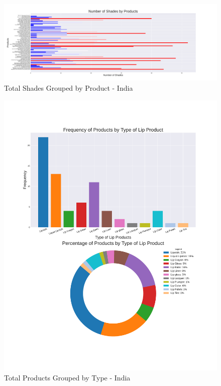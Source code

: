 \documentclass{article}
\begin{document}
\begin{center}
    \begin{landscape}
        \begin{figure}[htbp]
            \centering
            \includegraphics[scale=0.49]{../images/India-graphs/TotalShadesByProduct.pdf}
            \caption{Total Shades Grouped by Product - India}
            \label{Shades_by_Product_ind}
        \end{figure}
    \end{landscape}

    \begin{figure}[htbp]
        \centering
        \includegraphics[scale=0.46]{../images/India-graphs/TotalProductsbyType.pdf}
        \caption{Total Products Grouped by Type - India}
        \label{Products_by_Type_ind}
    \end{figure}


\end{center}
\end{document}
